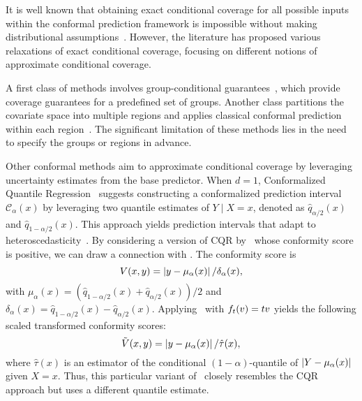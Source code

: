 
\vspace{-10pt}
  It is well known that obtaining exact conditional coverage for all possible inputs within the conformal prediction framework is impossible without making distributional assumptions~\cite{foygel2021limits}. However, the literature has proposed various relaxations of exact conditional coverage, focusing on different notions of approximate conditional coverage. 

  A first class of methods involves group-conditional guarantees~\cite{ding2024class,jung2022batch}, which provide coverage guarantees for a predefined set of groups. Another class partitions the covariate space into multiple regions and applies classical conformal prediction within each region~\cite{leroy2021md, alaa2023conformalized,kiyani2024conformal}. The significant limitation of these methods lies in the need to specify the groups or regions in advance.

  Other conformal methods aim to approximate conditional coverage by leveraging uncertainty estimates from the base predictor.
  When $d = 1$, Conformalized Quantile Regression~\citep[CQR;][]{romano2019conformalized} suggests constructing a conformalized prediction interval \( \mathcal{C}_{\alpha}(x) \) by leveraging two quantile estimates of \( Y \mid X = x \), denoted as \( \hat{q}_{\alpha/2}(x) \) and \( \hat{q}_{1-\alpha/2}(x) \).
  This approach yields prediction intervals that adapt to heteroscedasticity~\citep{kivaranovic2020adaptive}.
  By considering a version of CQR by~\citet{sesia2020comparison} whose conformity score is positive, we can draw a connection with \RCP. 
  The conformity score is
  \begin{equation*}
    V(x,y) = \left\lvert{y - \mu_\alpha(x) }\right\rvert/\delta_\alpha(x), 
  \end{equation*}
  with $\mu_\alpha(x)= (\hat{q}_{1-\alpha/2}(x)+\hat{q}_{\alpha/2}(x))/2$ and $\delta_\alpha(x)=\hat{q}_{1-\alpha/2}(x) - \hat{q}_{\alpha/2}(x)$.
  Applying \RCP\ with $f_{t}(v)=t v$ yields the following scaled transformed conformity scores:
  \begin{equation*}
    \tilde{V}(x,y) = \left\lvert{y -  \mu_\alpha(x)}\right\rvert / \hat{\tau}(x),
  \end{equation*}
  where $\widehat{\tau}(x)$ is an estimator of the conditional $(1-\alpha)$-quantile of $\left\lvert{Y -  \mu_\alpha(x)}\right\rvert$ given $X=x$. Thus, this particular variant of \RCP\ closely resembles the CQR approach but uses a different quantile estimate.

